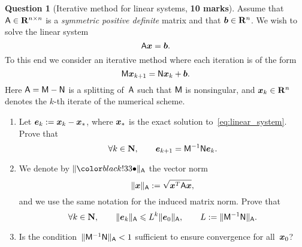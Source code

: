 \documentclass[11pt]{article}
\theoremstyle{definition}
\newtheorem{question}{Question}
\theoremstyle{remark}
\theoremstyle{plain}%
\begin{document}
\newpage
\begin{question}
    [Iterative method for linear systems, \textbf{10 marks}]
    Assume that $\mathsf A \in \mathbf R^{n \times n}$ is a \emph{symmetric positive definite} matrix and that $\mathbf{\boldsymbol{b}} \in \mathbf R^n$.
    We wish to solve the linear system
    \begin{equation}
        \label{eq:linear_system}
        \mathsf A \mathbf{\boldsymbol{x}} = \mathbf{\boldsymbol{b}}.
    \end{equation}
    To this end we consider an iterative method where each iteration is of the form
    \begin{equation}
        \label{eq:iterative_scheme}
        \mathsf M \mathbf{\boldsymbol{x}}_{k+1} = \mathsf N \mathbf{\boldsymbol{x}}_k + \mathbf{\boldsymbol{b}}.
    \end{equation}
    Here $\mathsf A = \mathsf M - \mathsf N$ is a splitting of~$\mathsf A$ such that $\mathsf M$ is nonsingular,
    and $\mathbf{\boldsymbol{x}}_k \in \mathbf R^n$ denotes the $k$-th iterate of the numerical scheme.

    \begin{enumerate}
        \itemsep0pt
        \item
            Let $\mathbf{\boldsymbol{e}}_k := \mathbf{\boldsymbol{x}}_k - \mathbf{\boldsymbol{x}}_*$,
            where $\mathbf{\boldsymbol{x}}_*$ is the exact solution to~\eqref{eq:linear_system}.
            Prove that
            \[
                \forall k \in \mathbf N, \qquad
                \mathbf{\boldsymbol{e}}_{k+1} = \mathsf M^{-1} \mathsf N \mathbf{\boldsymbol{e}}_k.
            \]

        \item
            We denote by $\norm{\placeholder}_{\mat A}$ the vector norm
            \begin{equation}
                \lVert\mathbf{\boldsymbol{x}}\rVert_{\mathsf A} := \sqrt{\mathbf{\boldsymbol{x}}^T \mathsf A \mathbf{\boldsymbol{x}}},
            \end{equation}
            and we use the same notation for the induced matrix norm.
            Prove that
            \begin{equation}
                \label{eq:inequality_interpolation}
                \forall k \in \mathbf N, \qquad
                \lVert\mathbf{\boldsymbol{e}}_k\rVert_{\mathsf A} \leqslant L^k \lVert\mathbf{\boldsymbol{e}}_0\rVert_{\mathsf A},
                \qquad L := \lVert\mathsf M^{-1} \mathsf N\rVert_{\mathsf A}.
            \end{equation}

        \item
            \mymark
            Is the condition~$\lVert\mathsf M^{-1} \mathsf N\rVert_{\mathsf A} < 1$ sufficient to ensure convergence for all~$\mathbf{\boldsymbol{x}}_0$?


\end{enumerate}
\end{question}
\end{document}
